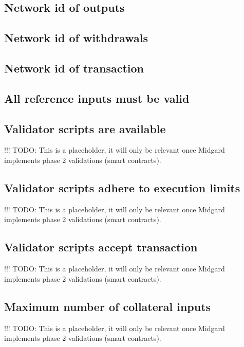 \documentclass[../midgard.tex]{subfiles}
\begin{document}
\subsection{Network id of outputs}
\label{rule:network-id-of-outputs}

\subsection{Network id of withdrawals}
\label{rule:network-id-of-withdrawals}

\subsection{Network id of transaction}
\label{rule:network-id-of-transaction}

\subsection{All reference inputs must be valid}
\label{rule:all-reference-inputs-must-be-valid}


\subsection{Validator scripts are available}
\label{rule:validator-scripts-are-available}

!!! TODO: This is a placeholder, it will only be relevant once Midgard implements phase 2 validations (smart contracts).

\subsection{Validator scripts adhere to execution limits}
\label{rule:validator-scripts-adhere-to-execution-limits}

!!! TODO: This is a placeholder, it will only be relevant once Midgard implements phase 2 validations (smart contracts).

\subsection{Validator scripts accept transaction}
\label{rule:validator-scripts-accept-transaction}

!!! TODO: This is a placeholder, it will only be relevant once Midgard implements phase 2 validations (smart contracts).

\subsection{Maximum number of collateral inputs}
\label{rule:maximum-number-of-collateral-inputs}

!!! TODO: This is a placeholder, it will only be relevant once Midgard implements phase 2 validations (smart contracts).
\end{document}
